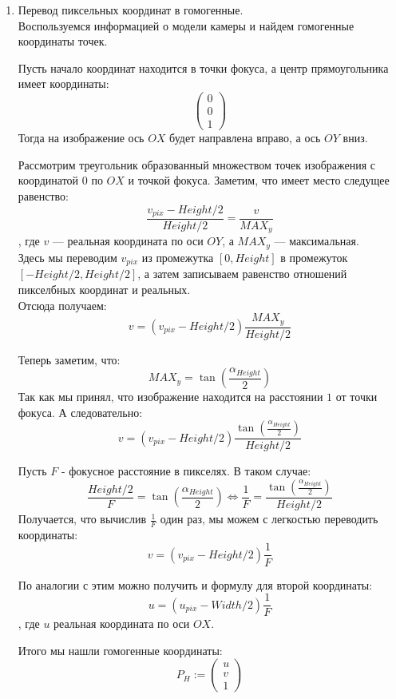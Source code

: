 \documentclass[12pt]{article}
\newenvironment{MyList}[1][4pt]{
  \begin{enumerate}[1.]
  \setlength{\parskip}{0pt}
  \setlength{\itemsep}{#1}
}{       
  \end{enumerate}
}
\begin{document}
	\newpage
	\begin{MyList}
		\item{Перевод пиксельных координат в гомогенные.}\\
		Воспользуемся информацией о модели камеры и найдем гомогенные координаты точек.
		
		Пусть начало координат находится в точки фокуса, а центр прямоугольника имеет координаты:
		$$ \begin{pmatrix} 
		0 \\
		0 \\
		1
		\end{pmatrix} $$
		Тогда на изображение ось $OX$ будет направлена вправо, а ось $OY$ вниз.
		
		Рассмотрим треугольник образованный множеством точек изображения с координатой $0$ по $OX$ и точкой фокуса. Заметим, что имеет место следущее равенство:
		$$\frac{v_{pix} - Height/2}{Height/2} = \frac{v}{MAX_y}$$
		, где $v$ --- реальная координата по оси $OY$, а $MAX_y$ --- максимальная.\\
		
		Здесь мы переводим $v_{pix}$ из промежутка $[0, Height]$ в промежуток $[-Height/2, Height/2]$, а затем записываем равенство отношений пикселбных координат и реальных.\\
		Отсюда получаем:
		$$v = (v_{pix} - Height/2) \frac{MAX_y}{Height/2}$$
		
		Теперь заметим, что:
		$$MAX_y = \tan(\frac{\alpha_{Height}}{2})$$
		Так как мы принял, что изображение находится на расстоянии $1$ от точки фокуса. А следовательно:
		$$v = (v_{pix} - Height/2) \frac{\tan(\frac{\alpha_{Height}}{2})}{Height/2}$$
		
		Пусть $F$ - фокусное расстояние в пикселях. В таком случае:
		$$\frac{Height/2}{F} = \tan(\frac{\alpha_{Height}}{2}) \Leftrightarrow \frac{1}{F} = \frac{\tan(\frac{\alpha_{Height}}{2})}{Height/2}$$
		Получается, что вычислив $\frac{1}{F}$ один раз, мы можем с легкостью переводить координаты:
		$$v = (v_{pix} - Height/2) \frac{1}{F}$$
		
		По аналогии с этим можно получить и формулу для второй координаты:
		$$u = (u_{pix} - Width/2) \frac{1}{F}$$
		, где $u$ реальная координата по оси $OX$.
		
		Итого мы нашли гомогенные координаты:
		$$P_H := \begin{pmatrix} 
		u \\
		v \\
		1
		\end{pmatrix}$$
		

\end{MyList}
\end{document}
